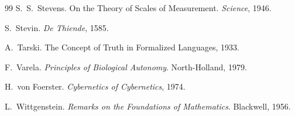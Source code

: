 \documentclass[12pt,a4paper]{article}
\theoremstyle{definition}
\theoremstyle{remark}
\begin{document}
\begin{thebibliography}{99}
S.~S.~Stevens.
\newblock On the Theory of Scales of Measurement.
\newblock \emph{Science}, 1946.

S.~Stevin.
\newblock \emph{De Thiende}, 1585.

A.~Tarski.
\newblock The Concept of Truth in Formalized Languages, 1933.

F.~Varela.
\newblock \emph{Principles of Biological Autonomy}.
\newblock North-Holland, 1979.

H.~von Foerster.
\newblock \emph{Cybernetics of Cybernetics}, 1974.

L.~Wittgenstein.
\newblock \emph{Remarks on the Foundations of Mathematics}.
\newblock Blackwell, 1956.

\end{thebibliography}
\end{document}
